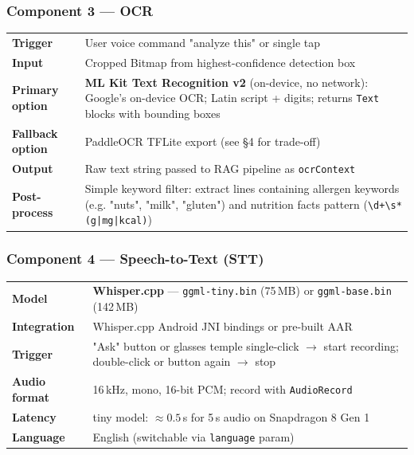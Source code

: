 \documentclass[11pt,a4paper]{article}
\begin{document}
\subsubsection{Component 3 — OCR}

\begin{table}[h!]
\renewcommand{\arraystretch}{1.3}
\begin{tabularx}{\textwidth}{L{3cm} X}
\toprule
\textbf{Trigger} & User voice command "analyze this" or single tap \\
\textbf{Input} & Cropped Bitmap from highest-confidence detection box \\
\textbf{Primary option} & \textbf{ML Kit Text Recognition v2} (on-device, no network): Google's on-device OCR; Latin script + digits; returns \texttt{Text} blocks with bounding boxes \\
\textbf{Fallback option} & PaddleOCR TFLite export (see §4 for trade-off) \\
\textbf{Output} & Raw text string passed to RAG pipeline as \texttt{ocrContext} \\
\textbf{Post-process} & Simple keyword filter: extract lines containing allergen keywords (e.g. "nuts", "milk", "gluten") and nutrition facts pattern (\texttt{\textbackslash d+\textbackslash s*(g|mg|kcal)}) \\
\bottomrule
\end{tabularx}
\end{table}

\subsubsection{Component 4 — Speech-to-Text (STT)}

\begin{table}[h!]
\renewcommand{\arraystretch}{1.3}
\begin{tabularx}{\textwidth}{L{3cm} X}
\toprule
\textbf{Model} & \textbf{Whisper.cpp} — \texttt{ggml-tiny.bin} (75\,MB) or \texttt{ggml-base.bin} (142\,MB) \\
\textbf{Integration} & Whisper.cpp Android JNI bindings or pre-built AAR \\
\textbf{Trigger} & "Ask" button or glasses temple single-click $\rightarrow$ start recording; double-click or button again $\rightarrow$ stop \\
\textbf{Audio format} & 16\,kHz, mono, 16-bit PCM; record with \texttt{AudioRecord} \\
\textbf{Latency} & tiny model: $\approx 0.5$\,s for 5\,s audio on Snapdragon 8 Gen 1 \\
\textbf{Language} & English (switchable via \texttt{language} param) \\
\bottomrule
\end{tabularx}
\end{table}
\end{document}
